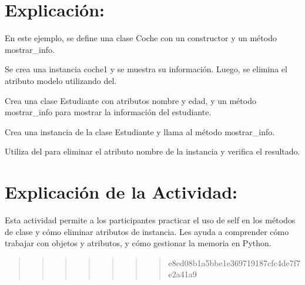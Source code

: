 \documentclass[
  a4paper,
  onepage,
  openany]{scrreprt}
\begin{document}
\hypertarget{explicaciuxf3n-55}{%
\section{Explicación:}\label{explicaciuxf3n-55}}

En este ejemplo, se define una clase Coche con un constructor y un
método mostrar\_info.

Se crea una instancia coche1 y se muestra su información. Luego, se
elimina el atributo modelo utilizando del.

\begin{tcolorbox}[enhanced jigsaw, breakable, opacityback=0, toptitle=1mm, coltitle=black, toprule=.15mm, rightrule=.15mm, colframe=quarto-callout-important-color-frame, opacitybacktitle=0.6, arc=.35mm, title=\textcolor{quarto-callout-important-color}{\faExclamation}\hspace{0.5em}{Actividad Práctica:}, titlerule=0mm, colbacktitle=quarto-callout-important-color!10!white, bottomtitle=1mm, bottomrule=.15mm, colback=white, left=2mm, leftrule=.75mm]

Crea una clase Estudiante con atributos nombre y edad, y un método
mostrar\_info para mostrar la información del estudiante.

Crea una instancia de la clase Estudiante y llama al método
mostrar\_info.

Utiliza del para eliminar el atributo nombre de la instancia y verifica
el resultado.

\end{tcolorbox}

\hypertarget{explicaciuxf3n-de-la-actividad-53}{%
\section{Explicación de la
Actividad:}\label{explicaciuxf3n-de-la-actividad-53}}

Esta actividad permite a los participantes practicar el uso de self en
los métodos de clase y cómo eliminar atributos de instancia. Les ayuda a
comprender cómo trabajar con objetos y atributos, y cómo gestionar la
memoria en Python.

\begin{quote}
\begin{quote}
\begin{quote}
\begin{quote}
\begin{quote}
\begin{quote}
\begin{quote}
e8ed08b1a5bbe1e369719187cfc4de7f7e2a41a9
\end{quote}
\end{quote}
\end{quote}
\end{quote}
\end{quote}
\end{quote}
\end{quote}
\end{document}
